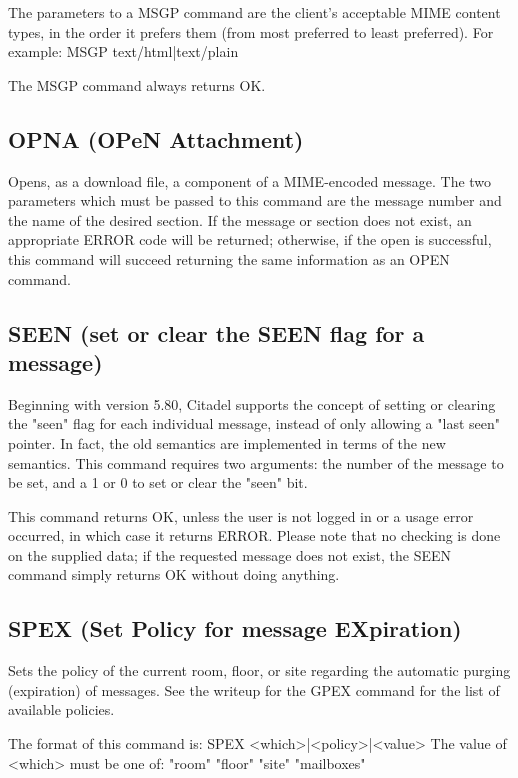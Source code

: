  The parameters to a MSGP command are the client's acceptable MIME content
types, in the order it prefers them (from most preferred to least preferred).
For example:  MSGP text/html|text/plain

 The MSGP command always returns OK.



\subsection{OPNA (OPeN Attachment)}

 Opens, as a download file, a component of a MIME-encoded message.  The two
parameters which must be passed to this command are the message number and the
name of the desired section.  If the message or section does not exist, an
appropriate ERROR code will be returned; otherwise, if the open is successful,
this command will succeed returning the same information as an OPEN command.



\subsection{SEEN (set or clear the SEEN flag for a message)}

 Beginning with version 5.80, Citadel supports the concept of setting or
clearing the "seen" flag for each individual message, instead of only allowing
a "last seen" pointer.  In fact, the old semantics are implemented in terms
of the new semantics.  This command requires two arguments: the number of the
message to be set, and a 1 or 0 to set or clear the "seen" bit.

 This command returns OK, unless the user is not logged in or a usage error
occurred, in which case it returns ERROR.  Please note that no checking is
done on the supplied data; if the requested message does not exist, the SEEN
command simply returns OK without doing anything.



\subsection{SPEX (Set Policy for message EXpiration)}

 Sets the policy of the current room, floor, or site regarding the automatic
purging (expiration) of messages.  See the writeup for the GPEX command for
the list of available policies.

 The format of this command is:  SPEX <which>|<policy>|<value>
 The value of <which> must be one of: "room" "floor" "site" "mailboxes"

